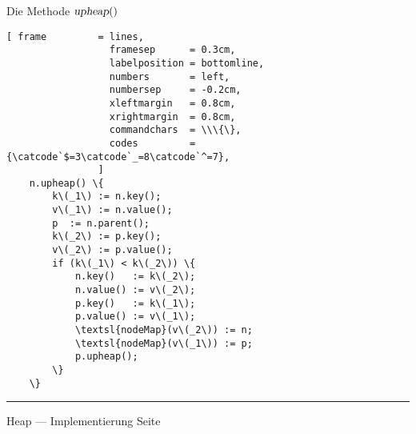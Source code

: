 \documentclass{slides}
\newcounter{mypage}
\begin{document}
\begin{slide}{}
\normalsize

\begin{center}
Die Methode $\textsl{upheap}()$
\end{center}
\vspace*{0.5cm}

\footnotesize

\begin{Verbatim}[ frame         = lines, 
                  framesep      = 0.3cm, 
                  labelposition = bottomline,
                  numbers       = left,
                  numbersep     = -0.2cm,
                  xleftmargin   = 0.8cm,
                  xrightmargin  = 0.8cm,
                  commandchars  = \\\{\},
                  codes         = {\catcode`$=3\catcode`_=8\catcode`^=7},
                ]
    n.upheap() \{
        k\(_1\) := n.key();
        v\(_1\) := n.value();
        p  := n.parent();
        k\(_2\) := p.key();
        v\(_2\) := p.value();
        if (k\(_1\) < k\(_2\)) \{
            n.key()   := k\(_2\);
            n.value() := v\(_2\);
            p.key()   := k\(_1\);
            p.value() := v\(_1\);
            \textsl{nodeMap}(v\(_2\)) := n;
            \textsl{nodeMap}(v\(_1\)) := p;
            p.upheap();
        \}
    \}
\end{Verbatim} 

\vspace*{\fill}
\tiny \addtocounter{mypage}{1}
\rule{17cm}{1mm}
Heap --- Implementierung \hspace*{\fill} Seite 
\end{slide}

\end{document}
